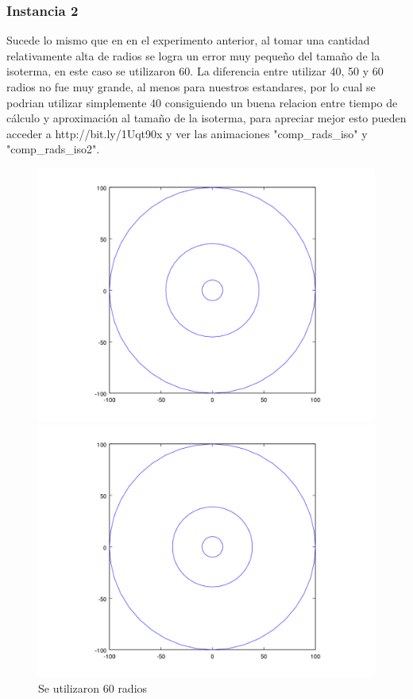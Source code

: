 \subsubsection{Instancia 2}

  \footnotesize{Sucede lo mismo que en en el experimento anterior, al tomar una cantidad relativamente alta de radios se logra un error muy pequeño del tamaño de la isoterma, en este caso se utilizaron 60. La diferencia entre utilizar 40, 50 y 60 radios no fue muy grande, al menos para nuestros estandares, por lo cual se podrian utilizar simplemente 40 consiguiendo un buena relacion entre tiempo de cálculo y aproximación al tamaño de la isoterma, para apreciar mejor esto pueden acceder a http://bit.ly/1Uqt90x y ver las animaciones "comp_rads_iso" y "comp_rads_iso2".}

\begin{figure}[H]
\centering
\begin{minipage}{0.48\textwidth}
  \centering
    \includegraphics[width=1\textwidth]{imgs/comp_rads_malo/comp_rads_iso5.png}
	\caption{Se utilizaron 60 radios}  
  \label{fig:Radios3}
\end{minipage}%
\hspace{0.03\textwidth}
\begin{minipage}{0.48\textwidth}   
  \centering
    \includegraphics[width=1\textwidth]{imgs/comp_rads_malo/comp_rads_iso0.png} 

\end{minipage}
\end{figure}
